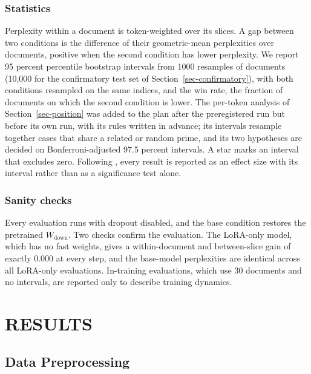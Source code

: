 \documentclass[12pt,a4paper]{report}
\begin{document}
\subsection{Statistics}

Perplexity within a document is token-weighted over its slices. A gap between two conditions is the difference of their geometric-mean perplexities over documents, positive when the second condition has lower perplexity. We report 95 percent percentile bootstrap intervals from 1000 resamples of documents (10{,}000 for the confirmatory test set of Section~\ref{sec-confirmatory}), with both conditions resampled on the same indices, and the win rate, the fraction of documents on which the second condition is lower. The per-token analysis of Section~\ref{sec-position} was added to the plan after the preregistered run but before its own run, with its rules written in advance; its intervals resample together cases that share a related or random prime, and its two hypotheses are decided on Bonferroni-adjusted 97.5 percent intervals. A star marks an interval that excludes zero. Following \citet{meister2021beyond}, every result is reported as an effect size with its interval rather than as a significance test alone.

\subsection{Sanity checks}

Every evaluation runs with dropout disabled, and the base condition restores the pretrained $W_{\mathrm{down}}$. Two checks confirm the evaluation. The LoRA-only model, which has no fast weights, gives a within-document and between-slice gain of exactly 0.000 at every step, and the base-model perplexities are identical across all LoRA-only evaluations. In-training evaluations, which use 30 documents and no intervals, are reported only to describe training dynamics.

\chapter{RESULTS}
\label{ch-results}

\section{Data Preprocessing}
\end{document}
